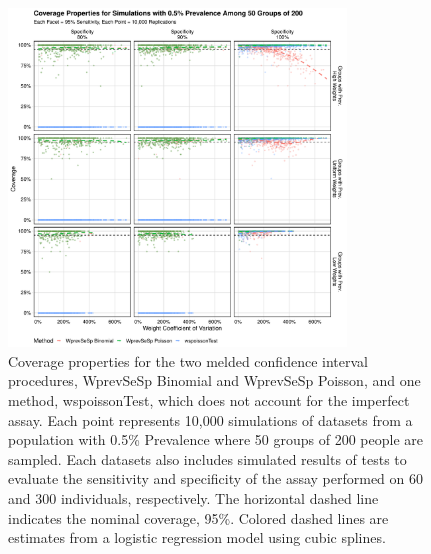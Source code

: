 \documentclass[AMA,STIX1COL]{WileyNJD-v2}
\begin{document}
\begin{figure}
\centering
\includegraphics[width=0.8\textwidth]{figures/imperfect_coverage_50_groups_0_005_prev.pdf}
\caption{Coverage properties for the two melded confidence interval procedures, WprevSeSp Binomial and WprevSeSp Poisson, and one method, wspoissonTest, which does not account for the imperfect assay.
Each point represents 10,000 simulations of datasets from a population with 0.5\% Prevalence where 50 groups of 200 people are sampled.
Each datasets also includes simulated results of tests to evaluate the sensitivity and specificity of the assay performed on 60 and 300 individuals, respectively.
The horizontal dashed line indicates the nominal coverage, 95\%.
Colored dashed lines are estimates from a logistic regression model using cubic splines.}
\label{fig:imperfect_coverage_50_groups_0_005_prev}
\end{figure}
\end{document}
